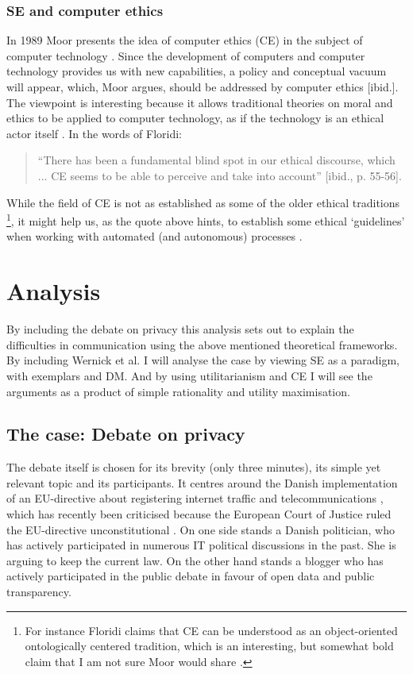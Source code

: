 \documentclass{article}
\begin{document}
\subsubsection{SE and computer ethics} \label{Theory:Ethics}
In 1989 Moor presents the idea of computer ethics (CE) in the subject of computer technology \citep{Moor:1985}. Since the development of computers and computer technology provides us with new capabilities, a policy and conceptual vacuum will appear, which, Moor argues, should be addressed by computer ethics [ibid.]. The viewpoint is interesting because it allows traditional theories on moral and ethics to be applied to computer technology, as if the technology is an ethical actor itself \citep{Floridi:1999}. In the words of Floridi:
\begin{quote}
``There has been a fundamental blind spot in our ethical discourse, which ... CE seems to be able to perceive and take into account'' [ibid., p. 55-56].
\end{quote}

While the field of CE is not as established as some of the older ethical traditions \footnote{For instance Floridi claims that CE can be understood as an object-oriented ontologically centered tradition, which is an interesting, but somewhat bold claim that I am not sure Moor would share \citep{Floridi:1999}.}, it might help us, as the quote above hints, to establish some ethical `guidelines' when working with automated (and autonomous) processes  \citep{Jensen:2014}.

\section{Analysis}
By including the debate on privacy this analysis sets out to explain the difficulties in communication using the above mentioned theoretical frameworks. By including Wernick et al. I will analyse the case by viewing SE as a paradigm, with exemplars and DM. And by using utilitarianism and CE I will see the arguments as a product of simple rationality and utility maximisation. 

\subsection{The case: Debate on privacy}
The debate itself is chosen for its brevity (only three minutes), its simple yet relevant topic and its participants. It centres around the Danish implementation of an EU-directive about registering internet traffic and telecommunications \citep{Retsinfo:Logning}, which has recently been criticised because the European Court of Justice ruled the EU-directive unconstitutional \citep{EC:2014}. On one side stands a Danish politician, who has actively participated in numerous IT political discussions in the past. She is arguing to keep the current law. On the other hand stands a blogger who has actively participated in the public debate in favour of open data and public transparency.
\end{document}
